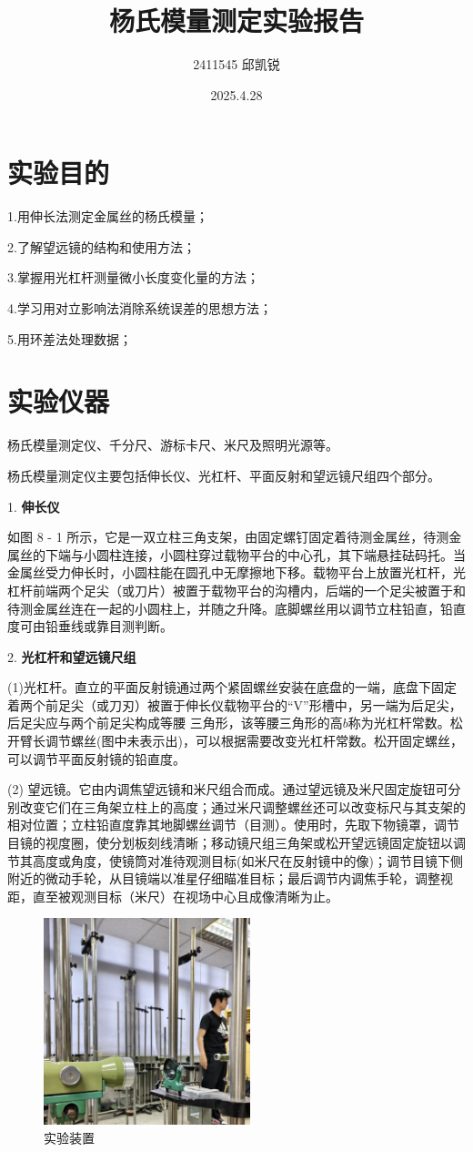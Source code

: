 \documentclass{article}
\title{杨氏模量测定实验报告}
\author{2411545 邱凯锐}
\date{2025.4.28}
\begin{document}
\maketitle
\section{实验目的}
1.用伸长法测定金属丝的杨氏模量；

2.了解望远镜的结构和使用方法；

3.掌握用光杠杆测量微小长度变化量的方法；

4.学习用对立影响法消除系统误差的思想方法；

5.用环差法处理数据；

\section{实验仪器}
杨氏模量测定仪、千分尺、游标卡尺、米尺及照明光源等。

杨氏模量测定仪主要包括伸长仪、光杠杆、平面反射和望远镜尺组四个部分。

1. \textbf{伸长仪}

如图 8 - 1 所示，它是一双立柱三角支架，由固定螺钉固定着待测金属丝，待测金属丝的下端与小圆柱连接，小圆柱穿过载物平台的中心孔，其下端悬挂砝码托。当金属丝受力伸长时，小圆柱能在圆孔中无摩擦地下移。载物平台上放置光杠杆，光杠杆前端两个足尖（或刀片）被置于载物平台的沟槽内，后端的一个足尖被置于和待测金属丝连在一起的小圆柱上，并随之升降。底脚螺丝用以调节立柱铅直，铅直度可由铅垂线或靠目测判断。

2. \textbf{光杠杆和望远镜尺组}
    
(1)光杠杆。直立的平面反射镜通过两个紧固螺丝安装在底盘的一端，底盘下固定着两个前足尖（或刀刃）被置于伸长仪载物平台的“V”形槽中，另一端为后足尖，后足尖应与两个前足尖构成等腰
三角形，该等腰三角形的高\(b\)称为光杠杆常数。松开臂长调节螺丝(图中未表示出)，可以根据需要改变光杠杆常数。松开固定螺丝，可以调节平面反射镜的铅直度。

(2) 望远镜。它由内调焦望远镜和米尺组合而成。通过望远镜及米尺固定旋钮可分别改变它们在三角架立柱上的高度；通过米尺调整螺丝还可以改变标尺与其支架的相对位置；立柱铅直度靠其地脚螺丝调节（目测）。使用时，先取下物镜罩，调节目镜的视度圈，使分划板刻线清晰；移动镜尺组三角架或松开望远镜固定旋钮以调节其高度或角度，使镜筒对准待观测目标(如米尺在反射镜中的像)；调节目镜下侧附近的微动手轮，从目镜端以准星仔细瞄准目标；最后调节内调焦手轮，调整视距，直至被观测目标（米尺）在视场中心且成像清晰为止。

\begin{figure}
    \centering
    \includegraphics[width=6cm]{1.jpg}
    \caption{实验装置}
\end{figure}
\end{document}
